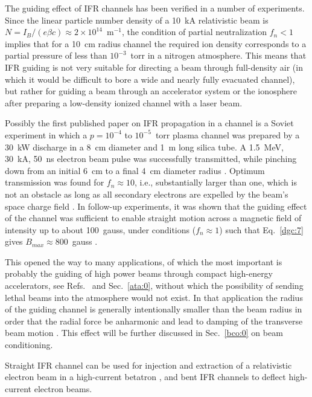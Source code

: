 \documentclass [12pt,a4paper,     ]{report} %
\begin{document}
The guiding effect of IFR channels has been verified in a number of experiments.  Since the linear particle number density of a 10~kA relativistic beam is $N = I_B/(e\beta c) \approx 2 \times 10^{14}$~m$^{-1}$, the condition of partial neutralization $f_n < 1$ implies that for a 10~cm radius channel the required ion density corresponds to a partial pressure of less than $10^{-3}$~torr in a nitrogen atmosphere.  This means that IFR guiding is not very suitable for directing a beam through full-density air (in which it would be difficult to bore a wide and nearly fully evacuated channel), but rather for guiding a beam through an accelerator system or the ionosphere after preparing a low-density ionized channel with a laser beam.

   Possibly the first published paper on IFR propagation in a channel is a Soviet experiment in which a $p = 10^{-4}$ to $10^{-5}$~torr plasma channel was prepared by a 30~kW discharge in a 8~cm diameter and 1~m long silica tube.  A 1.5~MeV, 30~kA, 50~ns electron beam pulse was successfully transmitted, while pinching down from an initial 6~cm to a final 4~cm diameter radius \cite{DIDEN1976A}.  Optimum transmission was found for $f_n \approx 10$, i.e., substantially larger than one, which is not an obstacle as long as all secondary electrons are expelled by the beam's space charge field \cite{BRIGG1977-}.  In follow-up experiments, it was shown that the guiding effect of the channel was sufficient to enable straight motion across a magnetic field of intensity up to about 100~gauss, under conditions ($f_n \approx 1$) such that Eq.~\eqref{dgc:7} gives $B_{max} \approx 800$~gauss \cite{DIDEN1977-}.

   This opened the way to many applications, of which the most important is probably the guiding of high power beams through compact high-energy accelerators, see  Refs.~\cite{BRIGG1981-, PRONO1985B, CAPOR1986-, MILLE1987-} and Sec.~\ref{ata:0}, without which the possibility of sending lethal beams into the atmosphere would not exist.  In that application the radius of the guiding channel is generally intentionally smaller than the beam radius in order that the radial force be anharmonic and lead to damping of the transverse beam motion \cite{CAPOR1986-}.  This effect will be further discussed in Sec.~\ref{bco:0} on beam conditioning.

   Straight IFR channel can be used for injection and extraction of a relativistic electron beam in a high-current betatron \cite{HUI--1984B}, and bent IFR channels to deflect high-current electron beams.
\end{document}
